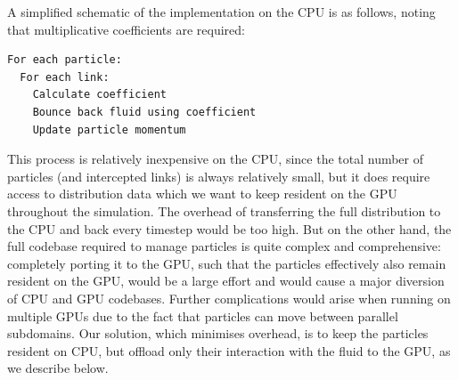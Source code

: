 A simplified schematic of the implementation on the CPU is as follows,
noting that multiplicative coefficients are required:
{\footnotesize
\begin{verbatim}
For each particle:
  For each link:
    Calculate coefficient
    Bounce back fluid using coefficient
    Update particle momentum
\end{verbatim}
}
This process is relatively inexpensive on the CPU, since the total
number of particles (and intercepted links) is always relatively
small, but it does require access to distribution data which we want
to keep resident on the GPU throughout the simulation. The overhead of
transferring the full distribution to the CPU and back every timestep
would be too high. But on the other hand, the full codebase required
to manage particles is quite complex and comprehensive: completely
porting it to the GPU, such that the particles effectively also remain
resident on the GPU, would be a large effort and would cause a major
diversion of CPU and GPU codebases. Further complications would arise
when running on multiple GPUs due to the fact that particles can move
between parallel subdomains. Our solution, which minimises overhead,
is to keep the particles resident on CPU, but offload only their interaction with the fluid to the GPU, as we describe below.
 
